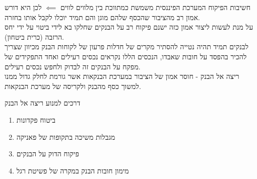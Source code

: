 \documentclass[usenames,dvipsnames]{beamer}
\begin{document}
\begin{RTL}
\begin{frame}[allowframebreaks]
    \framebreak
    \begin{block}{חשיבות הפיקוח}
        המערכת הפיננסית משמשת כמתווכת בין מלווים לווים $\impliedby$ לכן היא דורש אמון רב מהציבור שהכסף שלהם מוגן והם תמיד יוכלו לקבל אותו בחזרה.
        \newline
        \\
        על מנת לעשות ליצור אמון כזה ישנם פיקוח רב על הבנקים שחלקו בא לידי ביטוי על ידי יחס הרזבה (כרית ביטחון).
        \newline
        \\
        לבנקים תמיד תהיה נטייה להסתיר מקרים של חדלות פרעון של לקוחות הבנק מכיוון שצריך להכיר בהפסד על חובות שאבדו, הנכסים הללו נקראים נכסים רעילים ואחד התפקידים של מפקח על הבנקים זה לבדוק ולחפש נכסים רעילים.
        \newline
        \\
        ריצה אל הבנק - חוסר אמון של הציבור במערכת הבנקאות אשר גורמת לחלק גדול ממנו למשוך כסף מהבנק ולקריסה של מערכת הבנקאות.
    \end{block}


    \framebreak
    \begin{block}{דרכים למנוע ריצה אל הבנק}
        \begin{enumerate}
            \item ביטוח פקדונות
            \item מגבלות משיכה בתקופות של פאניקה
            \item פיקוח הדוק על הבנקים
            \item מימון חובות הבנק במקרה של פשיטת רגל
        \end{enumerate}
    \end{block}
    

\end{frame}




\end{RTL}
\end{document}
